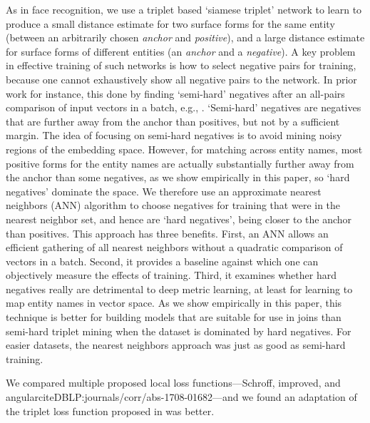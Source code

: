 As in face recognition, we use a triplet based `siamese triplet' network to learn to produce a small distance estimate for two surface forms for the same entity (between an arbitrarily chosen \textit{anchor} and \textit{positive}), and a large distance estimate for surface forms of different entities (an \textit{anchor} and a \textit{negative}).  A key problem in effective training of such networks is how to select negative pairs for training, because one cannot exhaustively show all negative pairs to the network.  In prior work for instance, this done by finding `semi-hard' negatives after an all-pairs comparison of input vectors in a batch, e.g., \cite{DBLP:conf/cvpr/SchroffKP15}.  `Semi-hard' negatives are negatives that are further away from the anchor than positives, but not by a sufficient margin.  The idea of focusing on semi-hard negatives is to avoid mining noisy regions of the embedding space.  However, for matching across entity names, most positive forms for the entity names are actually substantially further away from the anchor than some negatives, as we show empirically in this paper, so `hard negatives' dominate the space.  We therefore use an approximate nearest neighbors (ANN) algorithm to choose negatives for training that were in the nearest neighbor set, and hence are `hard negatives', being closer to the anchor than positives.  This approach has three benefits.  First, an ANN allows an efficient gathering of all nearest neighbors without a quadratic comparison of vectors in a batch.  Second, it provides a baseline against which one can objectively measure the effects of training.  Third, it examines whether hard negatives really are detrimental to deep metric learning, at least for learning to map entity names in vector space.  As we show empirically in this paper, this technique is better for building models that are suitable for use in joins than semi-hard triplet mining when the dataset is dominated by hard negatives.  For easier datasets, the nearest neighbors approach was just as good as semi-hard training.

We compared multiple proposed local loss functions---Schroff\cite{DBLP:conf/cvpr/SchroffKP15}, improved\cite{Zhang:2016:DML:3088616.3088665}, and angularcite{DBLP:journals/corr/abs-1708-01682}---and we found an adaptation of the triplet loss function proposed in \cite{DBLP:conf/cvpr/SchroffKP15} was better.

